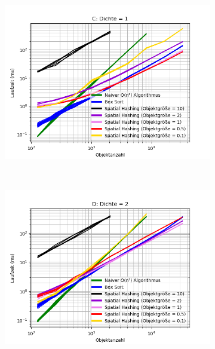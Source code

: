 \begin{figure}
\begin{subfigure}[t]{0.55\textwidth}
		\label{fig:symmetricComparison-B}
	\end{subfigure}
~
	\begin{subfigure}[t]{0.55\textwidth}
		\centering
		\includegraphics[width=1\textwidth]{./res/symmetricComparison-C.png}

		\label{fig:symmetricComparison-C}
	\end{subfigure}
~
	\begin{subfigure}[t]{0.55\textwidth}
		\centering
		\includegraphics[width=1\textwidth]{./res/symmetricComparison-D.png}


\end{subfigure}
\end{figure}

